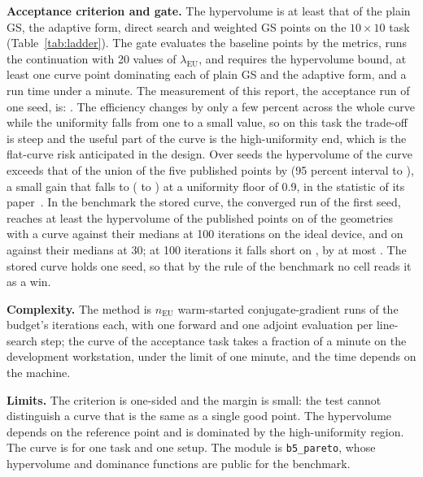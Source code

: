 \textbf{Acceptance criterion and gate.} The hypervolume is at least that of the plain GS, the adaptive form, direct search and weighted GS points on the $10\times10$ task (Table~\ref{tab:ladder}). The gate evaluates the baseline points by the metrics, runs the continuation with 20 values of $\lambda_{\mathrm{EU}}$, and requires the hypervolume bound, at least one curve point dominating each of plain GS and the adaptive form, and a run time under a minute. The measurement of this report, the acceptance run of one seed, is: . The efficiency changes by only a few percent across the whole curve while the uniformity falls from one to a small value, so on this task the trade-off is steep and the useful part of the curve is the high-uniformity end, which is the flat-curve risk anticipated in the design. Over  seeds the hypervolume of the curve exceeds that of the union of the five published points by  (95 percent interval  to ), a small gain that falls to  ( to ) at a uniformity floor of 0.9, in the statistic of its paper~\cite{b5paper}. In the benchmark the stored curve, the converged run of the first seed, reaches at least the hypervolume of the published points on \benchFivePass{} of the \benchFiveN{} geometries with a curve against their medians at 100 iterations on the ideal device, and on \benchFivePassThirty{} against their medians at 30; at 100 iterations it falls short on \benchFiveLost, by at most \benchFiveMargin{}. The stored curve holds one seed, so that by the rule of the benchmark no cell reads it as a win.

\textbf{Complexity.} The method is $n_{\mathrm{EU}}$ warm-started conjugate-gradient runs of the budget's iterations each, with one forward and one adjoint evaluation per line-search step; the curve of the acceptance task takes a fraction of a minute on the development workstation, under the limit of one minute, and the time depends on the machine.

\textbf{Limits.} The criterion is one-sided and the margin is small: the test cannot distinguish a curve that is the same as a single good point. The hypervolume depends on the reference point and is dominated by the high-uniformity region. The curve is for one task and one setup. The module is \texttt{b5\_pareto}, whose hypervolume and dominance functions are public for the benchmark.
